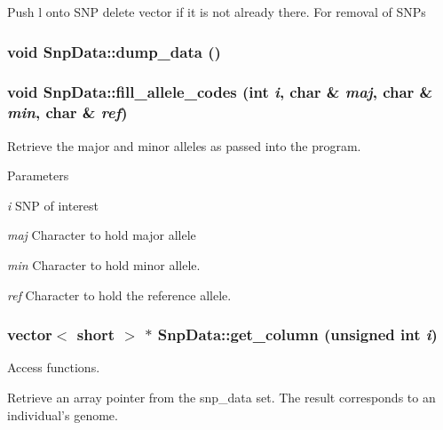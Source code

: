 Push l onto SNP delete vector if it is not already there. For removal of SNPs \hypertarget{classSnpData_a55e5ee9b74b0b6057393d8e19dd8fced}{
\subsubsection[{dump\_\-data}]{\setlength{\rightskip}{0pt plus 5cm}void SnpData::dump\_\-data ()}}
\label{classSnpData_a55e5ee9b74b0b6057393d8e19dd8fced}
\hypertarget{classSnpData_a1831ac542e4cad682c7235943e531179}{
\subsubsection[{fill\_\-allele\_\-codes}]{\setlength{\rightskip}{0pt plus 5cm}void SnpData::fill\_\-allele\_\-codes (int {\em i}, \/  char \& {\em maj}, \/  char \& {\em min}, \/  char \& {\em ref})}}
\label{classSnpData_a1831ac542e4cad682c7235943e531179}
Retrieve the major and minor alleles as passed into the program.


\begin{DoxyParams}{Parameters}
\item[{\em i}]SNP of interest \item[{\em maj}]Character to hold major allele \item[{\em min}]Character to hold minor allele. \item[{\em ref}]Character to hold the reference allele. \end{DoxyParams}
\hypertarget{classSnpData_af114df61aa4280e4e89e87395b7a22f3}{
\subsubsection[{get\_\-column}]{\setlength{\rightskip}{0pt plus 5cm}vector$<$ short $>$ $\ast$ SnpData::get\_\-column (unsigned int {\em i})}}
\label{classSnpData_af114df61aa4280e4e89e87395b7a22f3}


Access functions. 

Retrieve an array pointer from the snp\_\-data set. The result corresponds to an individual's genome.


